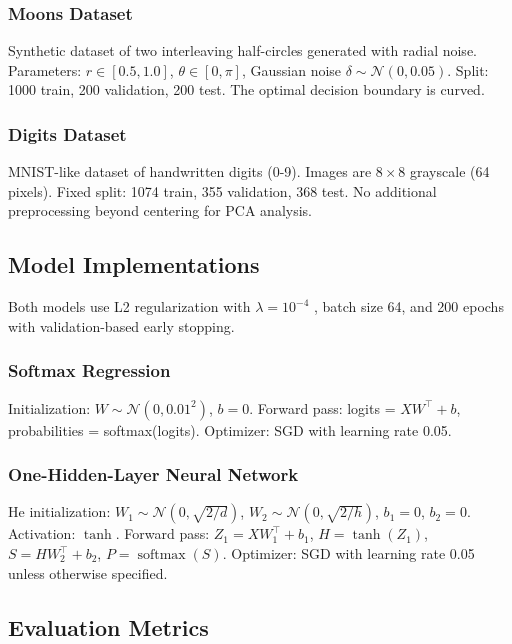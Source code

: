 \documentclass[sigconf,screen,nonacm,nofonts]{acmart}
\begin{document}
\subsubsection{Moons Dataset}
Synthetic dataset of two interleaving half-circles generated with radial noise. Parameters: \(r \in [0.5,1.0]\), \(\theta \in [0,\pi]\), Gaussian noise \(\delta \sim \mathcal{N}(0,0.05)\). Split: 1000 train, 200 validation, 200 test. The optimal decision boundary is curved.

\subsubsection{Digits Dataset}
MNIST-like dataset of handwritten digits (0-9). Images are \(8 \times 8\) grayscale (64 pixels). Fixed split: 1074 train, 355 validation, 368 test. No additional preprocessing beyond centering for PCA analysis.

\subsection{Model Implementations}

Both models use L2 regularization with \(\lambda = 10^{-4}\) \cite{murphy2022pml}, batch size 64, and 200 epochs with validation-based early stopping.

\subsubsection{Softmax Regression}
Initialization: \(W \sim \mathcal{N}(0, 0.01^2)\), \(b = 0\). Forward pass: logits = \(XW^\top + b\), probabilities = softmax(logits). Optimizer: SGD with learning rate 0.05.

\subsubsection{One-Hidden-Layer Neural Network}
He initialization: \(W_1 \sim \mathcal{N}(0, \sqrt{2/d})\), \(W_2 \sim \mathcal{N}(0, \sqrt{2/h})\), \(b_1 = 0\), \(b_2 = 0\). Activation: \(\tanh\). Forward pass: \(Z_1 = XW_1^\top + b_1\), \(H = \tanh(Z_1)\), \(S = HW_2^\top + b_2\), \(P = \operatorname{softmax}(S)\). Optimizer: SGD with learning rate 0.05 unless otherwise specified.

\subsection{Evaluation Metrics}
\end{document}
